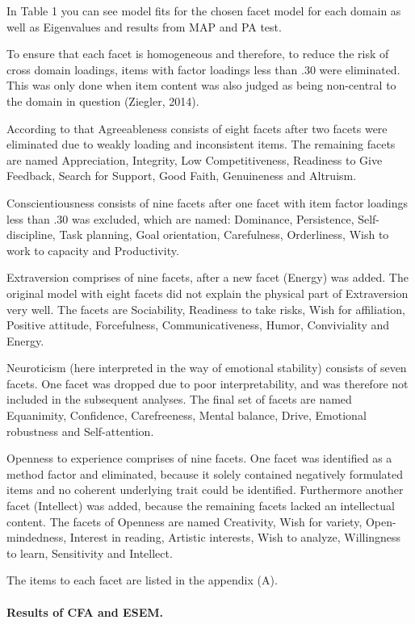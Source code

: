\documentclass[man]{apa6}
\theoremstyle{definition}
\theoremstyle{definition}
\theoremstyle{definition}
\theoremstyle{remark}
\begin{document}
In Table 1 you can see model fits for the chosen facet model for each
domain as well as Eigenvalues and results from MAP and PA test.

To ensure that each facet is homogeneous and therefore, to reduce the
risk of cross domain loadings, items with factor loadings less than .30
were eliminated. This was only done when item content was also judged as
being non-central to the domain in question (Ziegler, 2014).

According to that Agreeableness consists of eight facets after two
facets were eliminated due to weakly loading and inconsistent items. The
remaining facets are named Appreciation, Integrity, Low Competitiveness,
Readiness to Give Feedback, Search for Support, Good Faith, Genuineness
and Altruism.

Conscientiousness consists of nine facets after one facet with item
factor loadings less than .30 was excluded, which are named: Dominance,
Persistence, Self-discipline, Task planning, Goal orientation,
Carefulness, Orderliness, Wish to work to capacity and Productivity.

Extraversion comprises of nine facets, after a new facet (Energy) was
added. The original model with eight facets did not explain the physical
part of Extraversion very well. The facets are Sociability, Readiness to
take risks, Wish for affiliation, Positive attitude, Forcefulness,
Communicativeness, Humor, Conviviality and Energy.

Neuroticism (here interpreted in the way of emotional stability)
consists of seven facets. One facet was dropped due to poor
interpretability, and was therefore not included in the subsequent
analyses. The final set of facets are named Equanimity, Confidence,
Carefreeness, Mental balance, Drive, Emotional robustness and
Self-attention.

Openness to experience comprises of nine facets. One facet was
identified as a method factor and eliminated, because it solely
contained negatively formulated items and no coherent underlying trait
could be identified. Furthermore another facet (Intellect) was added,
because the remaining facets lacked an intellectual content. The facets
of Openness are named Creativity, Wish for variety, Open-mindedness,
Interest in reading, Artistic interests, Wish to analyze, Willingness to
learn, Sensitivity and Intellect.

The items to each facet are listed in the appendix (A).

\hypertarget{results-of-cfa-and-esem.}{%
\paragraph{Results of CFA and ESEM.}\label{results-of-cfa-and-esem.}}
\end{document}
